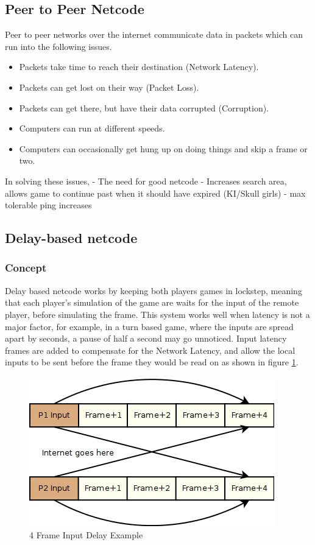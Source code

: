 \documentclass{entcs}
\begin{document}
\subsection{Peer to Peer Netcode}
Peer to peer networks over the internet communicate data in packets which can run into the following issues.
\begin{itemize}
\item{Packets take time to reach their destination (Network Latency).}
\item{Packets can get lost on their way (Packet Loss).}
\item{Packets can get there, but have their data corrupted (Corruption).}
\item{Computers can run at different speeds.}
\item{Computers can occasionally get hung up on doing things and skip a frame or two.}
\end{itemize}

In solving these issues, 
- The need for good netcode
- Increases search area, allows game to continue past when it should have expired (KI/Skull girls)
- max tolerable ping increases

\subsection{Delay-based netcode}
\subsubsection{Concept}
Delay based netcode works by keeping both players games in lockstep, meaning that each player's simulation of the game are waits for the input of the remote player, before simulating the frame\cite{DelayBasedNetcode}. This system works well when latency is not a major factor, for example, in a turn based game, where the inputs are spread apart by seconds, a pause of half a second may go unnoticed.
Input latency frames are added to compensate for the Network Latency, and allow the local inputs to be sent before the frame they would be read on as shown in figure \ref{fig:InputLatencyEffect}.

\begin{figure}[h]
\centering
\includegraphics{InputDelay}
\caption{4 Frame Input Delay Example \cite{FightingGameNetworking}}
\label{fig:InputLatencyEffect}
\end{figure}
\end{document}
